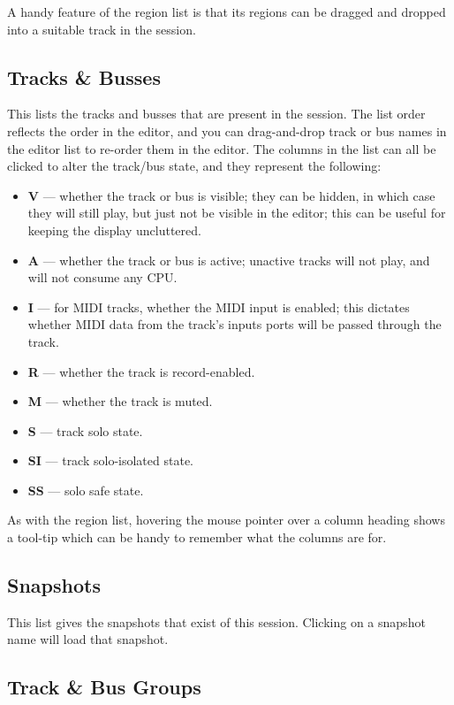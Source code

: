 \documentclass[10pt,a4paper]{book}
\begin{document}
A handy feature of the region list is that its regions can be dragged
and dropped into a suitable track in the session.

\subsection{Tracks \& Busses}

This lists the tracks and busses that are present in the session.  The
list order reflects the order in the editor, and you can drag-and-drop
track or bus names in the editor list to re-order them in the editor.
The columns in the list can all be clicked to alter the track/bus
state, and they represent the following:

\begin{itemize}
\item \textbf{V} --- whether the track or bus is visible; they can be
  hidden, in which case they will still play, but just not be visible
  in the editor; this can be useful for keeping the display uncluttered.
\item \textbf{A} --- whether the track or bus is active; unactive
  tracks will not play, and will not consume any CPU\@.
\item \textbf{I} --- for MIDI tracks, whether the MIDI input is
  enabled; this dictates whether MIDI data from the track's inputs
  ports will be passed through the track.
\item \textbf{R} --- whether the track is record-enabled.
\item \textbf{M} --- whether the track is muted.
\item \textbf{S} --- track solo state.
\item \textbf{SI} --- track solo-isolated state.
\item \textbf{SS} --- solo safe state.
\end{itemize}

As with the region list, hovering the mouse pointer over a column
heading shows a tool-tip which can be handy to remember what the
columns are for.

\subsection{Snapshots}

This list gives the snapshots that exist of this session.  Clicking on
a snapshot name will load that snapshot.

\subsection{Track \& Bus Groups}
\end{document}
